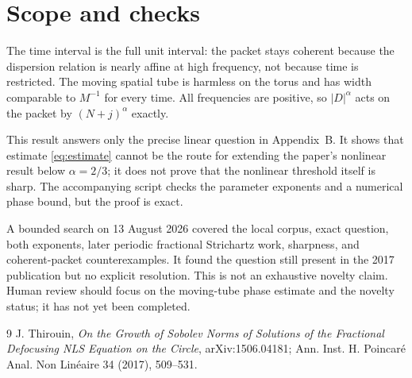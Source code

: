 \documentclass[11pt]{article}
\begin{document}
\section{Scope and checks}

The time interval is the full unit interval: the packet stays coherent
because the dispersion relation is nearly affine at high frequency, not
because time is restricted. The moving spatial tube is harmless on the torus
and has width comparable to $M^{-1}$ for every time. All frequencies are
positive, so $|D|^\alpha$ acts on the packet by $(N+j)^\alpha$ exactly.

This result answers only the precise linear question in Appendix~B. It shows
that estimate \eqref{eq:estimate} cannot be the route for extending the
paper's nonlinear result below $\alpha=2/3$; it does not prove that the
nonlinear threshold itself is sharp. The accompanying script checks the
parameter exponents and a numerical phase bound, but the proof is exact.

A bounded search on 13 August 2026 covered the local corpus, exact question,
both exponents, later periodic fractional Strichartz work, sharpness, and
coherent-packet counterexamples. It found the question still present in the
2017 publication but no explicit resolution. This is not an exhaustive
novelty claim. Human review should focus on the moving-tube phase estimate
and the novelty status; it has not yet been completed.

\begin{thebibliography}{9}
J. Thirouin, \emph{On the Growth of Sobolev Norms of Solutions of the
Fractional Defocusing NLS Equation on the Circle}, arXiv:1506.04181;
Ann. Inst. H. Poincar\'e Anal. Non Lin\'eaire 34 (2017), 509--531.
\end{thebibliography}
\end{document}
